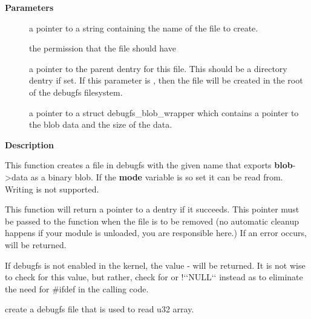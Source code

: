 \documentclass[a4paper,8pt,english]{sphinxmanual}
\begin{document}
\textbf{Parameters}
\begin{description}
\item[{}] \leavevmode
a pointer to a string containing the name of the file to create.

\item[{}] \leavevmode
the permission that the file should have

\item[{}] \leavevmode
a pointer to the parent dentry for this file.  This should be a
directory dentry if set.  If this parameter is , then the
file will be created in the root of the debugfs filesystem.

\item[{}] \leavevmode
a pointer to a struct debugfs\_blob\_wrapper which contains a pointer
to the blob data and the size of the data.

\end{description}

\textbf{Description}

This function creates a file in debugfs with the given name that exports
\textbf{blob}-\textgreater{}data as a binary blob. If the \textbf{mode} variable is so set it can be
read from. Writing is not supported.

This function will return a pointer to a dentry if it succeeds.  This
pointer must be passed to the {\hyperref[filesystems/index:c.debugfs_remove]{\emph{}}} function when the file is
to be removed (no automatic cleanup happens if your module is unloaded,
you are responsible here.)  If an error occurs,  will be returned.

If debugfs is not enabled in the kernel, the value - will be
returned.  It is not wise to check for this value, but rather, check for
 or !{}`{}`NULL{}`{}` instead as to eliminate the need for \#ifdef in the calling
code.

\begin{fulllineitems}
\label{filesystems/index:c.debugfs_create_u32_array}
create a debugfs file that is used to read u32 array.

\end{fulllineitems}
\end{document}
